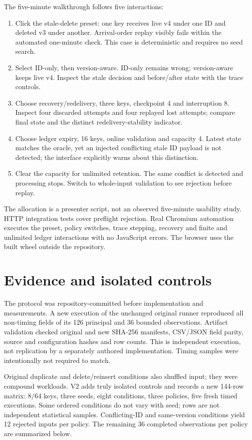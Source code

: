 \documentclass[sigconf,9pt]{acmart}
\begin{document}
The five-minute walkthrough follows five interactions:
\begin{enumerate}
\item Click the stale-delete preset: one key receives live v4 under one ID and deleted
v3 under another. Arrival-order replay visibly fails within the automated one-minute
check. This case is deterministic and requires no seed search.
\item Select ID-only, then version-aware. ID-only remains wrong; version-aware keeps
live v4. Inspect the stale decision and before/after state with the trace controls.
\item Choose recovery/redelivery, three keys, checkpoint 4 and interruption 8.
Inspect four discarded attempts and four replayed lost attempts; compare final state
and the distinct redelivery-stability indicator.
\item Choose ledger expiry, 16 keys, online validation and capacity 4. Latest state
matches the oracle, yet an injected conflicting stale ID payload is not detected;
the interface explicitly warns about this distinction.
\item Clear the capacity for unlimited retention. The same conflict is detected and
processing stops. Switch to whole-input validation to see rejection before replay.
\end{enumerate}
The allocation is a presenter script, not an observed five-minute usability study.
HTTP integration tests cover preflight rejection. Real Chromium automation executes
the preset, policy switches, trace stepping, recovery and finite and unlimited ledger
interactions with no JavaScript errors. The browser uses the built wheel outside the repository.

\section{Evidence and isolated controls}
The protocol was repository-committed before implementation and measurements.
A new execution of the unchanged original runner reproduced all non-timing fields
of its 126 principal and 36 bounded observations. Artifact validation checked original
and new SHA-256 manifests, CSV/JSON field parity, source and configuration hashes and
row counts. This is independent execution, not replication by a separately authored
implementation. Timing samples were intentionally not required to match.

Original duplicate and delete/reinsert conditions also shuffled input; they were
compound workloads. V2 adds truly isolated controls and records a new 144-row matrix:
8/64 keys, three seeds, eight conditions, three policies, five fresh timed executions.
Some ordered conditions do not vary with seed; rows are not independent statistical
samples. Conflicting-ID and same-version conditions yield 12 rejected inputs per
policy. The remaining 36 completed observations per policy are summarized below.
\end{document}
